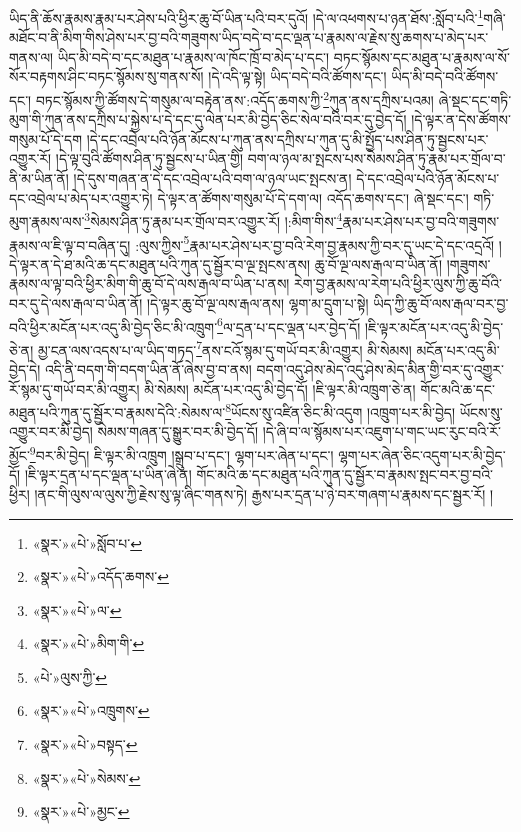 ཡིད་ནི་ཆོས་རྣམས་རྣམ་པར་ཤེས་པའི་ཕྱིར་ཆུ་བོ་ཡིན་པའི་བར་དུའོ། །དེ་ལ་འཕགས་པ་ཉན་ཐོས་:སློབ་པའི་\footnote{«སྣར་»«པེ་»སློབ་པ་}གཞི་མཐོང་བ་ནི་མིག་གིས་ཤེས་པར་བྱ་བའི་གཟུགས་ཡིད་བདེ་བ་དང་ལྡན་པ་རྣམས་ལ་རྗེས་སུ་ཆགས་པ་མེད་པར་གནས་ལ། ཡིད་མི་བདེ་བ་དང་མཐུན་པ་རྣམས་ལ་ཁོང་ཁྲོ་བ་མེད་པ་དང་། བཏང་སྙོམས་དང་མཐུན་པ་རྣམས་ལ་སོ་སོར་བརྟགས་ཤིང་བཏང་སྙོམས་སུ་གནས་སོ། །དེ་འདི་ལྟ་སྟེ། ཡིད་བདེ་བའི་ཚོགས་དང་། ཡིད་མི་བདེ་བའི་ཚོགས་དང་། བཏང་སྙོམས་ཀྱི་ཚོགས་དེ་གསུམ་ལ་བརྟེན་ནས་:འདོད་ཆགས་ཀྱི་\footnote{«སྣར་»«པེ་»འདོད་ཆགས་}ཀུན་ནས་དཀྲིས་པའམ། ཞེ་སྡང་དང་གཏི་མུག་གི་ཀུན་ནས་དཀྲིས་པ་སྐྱེས་པ་དེ་དང་དུ་ལེན་པར་མི་བྱེད་ཅིང་སེལ་བའི་བར་དུ་བྱེད་དོ། །དེ་ལྟར་ན་དེས་ཚོགས་གསུམ་པོ་དེ་དག །དེ་དང་འབྲེལ་པའི་ཉོན་མོངས་པ་ཀུན་ནས་དཀྲིས་པ་ཀུན་དུ་མི་སྤྱོད་པས་ཤིན་ཏུ་སྦྱངས་པར་འགྱུར་རོ། །དེ་ལྟ་བུའི་ཚོགས་ཤིན་ཏུ་སྦྱངས་པ་ཡིན་གྱི། བག་ལ་ཉལ་མ་སྤངས་པས་སེམས་ཤིན་ཏུ་རྣམ་པར་གྲོལ་བ་ནི་མ་ཡིན་ནོ། །དེ་དུས་གཞན་ན་དེ་དང་འབྲེལ་པའི་བག་ལ་ཉལ་ཡང་སྤངས་ན། དེ་དང་འབྲེལ་པའི་ཉོན་མོངས་པ་དང་འབྲེལ་པ་མེད་པར་འགྱུར་ཏེ། དེ་ལྟར་ན་ཚོགས་གསུམ་པོ་དེ་དག་ལ། འདོད་ཆགས་དང་། ཞེ་སྡང་དང་། གཏི་མུག་རྣམས་ལས་\footnote{«སྣར་»«པེ་»ལ་}སེམས་ཤིན་ཏུ་རྣམ་པར་གྲོལ་བར་འགྱུར་རོ། །:མིག་གིས་\footnote{«སྣར་»«པེ་»མིག་གི་}རྣམ་པར་ཤེས་པར་བྱ་བའི་གཟུགས་རྣམས་ལ་ཇི་ལྟ་བ་བཞིན་དུ། :ལུས་ཀྱིས་\footnote{«པེ་»ལུས་ཀྱི་}རྣམ་པར་ཤེས་པར་བྱ་བའི་རེག་བྱ་རྣམས་ཀྱི་བར་དུ་ཡང་དེ་དང་འདྲའོ། །དེ་ལྟར་ན་དེ་ཐ་མའི་ཆ་དང་མཐུན་པའི་ཀུན་དུ་སྦྱོར་བ་ལྔ་སྤངས་ནས། ཆུ་བོ་ལྔ་ལས་རྒལ་བ་ཡིན་ནོ། །གཟུགས་རྣམས་ལ་ལྟ་བའི་ཕྱིར་མིག་གི་ཆུ་བོ་དེ་ལས་རྒལ་བ་ཡིན་པ་ནས། རེག་བྱ་རྣམས་ལ་རེག་པའི་ཕྱིར་ལུས་ཀྱི་ཆུ་བོའི་བར་དུ་དེ་ལས་རྒལ་བ་ཡིན་ནོ། །དེ་ལྟར་ཆུ་བོ་ལྔ་ལས་རྒལ་ནས། ལྷག་མ་དྲུག་པ་སྟེ། ཡིད་ཀྱི་ཆུ་བོ་ལས་རྒལ་བར་བྱ་བའི་ཕྱིར་མངོན་པར་འདུ་མི་བྱེད་ཅིང་མི་འཁྲུག་\footnote{«སྣར་»«པེ་»འཁྲུགས་}ལ་དྲན་པ་དང་ལྡན་པར་བྱེད་དོ། །ཇི་ལྟར་མངོན་པར་འདུ་མི་བྱེད་ཅེ་ན། མྱ་ངན་ལས་འདས་པ་ལ་ཡིད་གཏད་\footnote{«སྣར་»«པེ་»བསྟད་}ནས་ངའོ་སྙམ་དུ་གཡོ་བར་མི་འགྱུར། མི་སེམས། མངོན་པར་འདུ་མི་བྱེད་དེ། འདི་ནི་བདག་གི་བདག་ཡིན་ནོ་ཞེས་བྱ་བ་ནས། བདག་འདུ་ཤེས་མེད་འདུ་ཤེས་མེད་མིན་གྱི་བར་དུ་འགྱུར་རོ་སྙམ་དུ་གཡོ་བར་མི་འགྱུར། མི་སེམས། མངོན་པར་འདུ་མི་བྱེད་དོ། །ཇི་ལྟར་མི་འཁྲུག་ཅེ་ན། གོང་མའི་ཆ་དང་མཐུན་པའི་ཀུན་དུ་སྦྱོར་བ་རྣམས་དེའི་:སེམས་ལ་\footnote{«སྣར་»«པེ་»སེམས་}ཡོངས་སུ་འཛིན་ཅིང་མི་འདུག །འཁྲུག་པར་མི་བྱེད། ཡོངས་སུ་འགྱུར་བར་མི་བྱེད། སེམས་གཞན་དུ་སྒྱུར་བར་མི་བྱེད་དོ། །དེ་ཞི་བ་ལ་སྙོམས་པར་འཇུག་པ་གང་ཡང་རུང་བའི་རོ་མྱོང་\footnote{«སྣར་»«པེ་»མྱང་}བར་མི་བྱེད། ཇི་ལྟར་མི་འཁྲུག །སྒྲུབ་པ་དང་། ལྷག་པར་ཞེན་པ་དང་། ལྷག་པར་ཞེན་ཅིང་འདུག་པར་མི་བྱེད་དོ། །ཇི་ལྟར་དྲན་པ་དང་ལྡན་པ་ཡིན་ཞེ་ན། གོང་མའི་ཆ་དང་མཐུན་པའི་ཀུན་དུ་སྦྱོར་བ་རྣམས་སྤང་བར་བྱ་བའི་ཕྱིར། །ནང་གི་ལུས་ལ་ལུས་ཀྱི་རྗེས་སུ་ལྟ་ཞིང་གནས་ཏེ། རྒྱས་པར་དྲན་པ་ཉེ་བར་གཞག་པ་རྣམས་དང་སྦྱར་རོ། །

